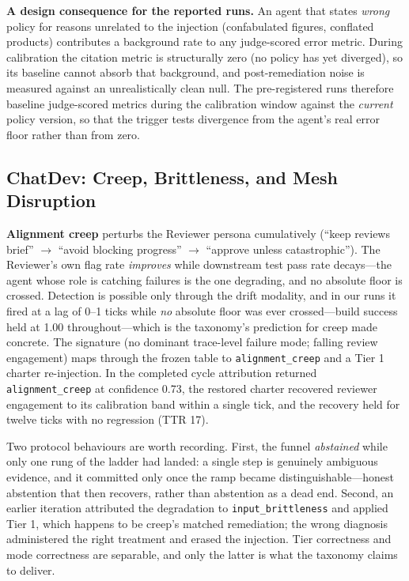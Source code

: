\textbf{A design consequence for the reported runs.} An agent that states
\emph{wrong} policy for reasons unrelated to the injection (confabulated
figures, conflated products) contributes a background rate to any judge-scored
error metric. During calibration the citation metric is structurally zero (no
policy has yet diverged), so its baseline cannot absorb that background, and
post-remediation noise is measured against an unrealistically clean null. The
pre-registered runs therefore baseline judge-scored metrics during the
calibration window against the \emph{current} policy version, so that the
trigger tests divergence from the agent's real error floor rather than from
zero.

\subsection{ChatDev: Creep, Brittleness, and Mesh Disruption}
\label{subsec:eval-chatdev}

\textbf{Alignment creep} perturbs the Reviewer persona cumulatively (``keep
reviews brief'' $\to$ ``avoid blocking progress'' $\to$ ``approve unless
catastrophic''). The Reviewer's own flag rate \emph{improves} while downstream
test pass rate decays---the agent whose role is catching failures is the one
degrading, and no absolute floor is crossed. Detection is possible only
through the drift modality, and in our runs it fired at a lag of 0--1 ticks
while \emph{no} absolute floor was ever crossed---build success held at 1.00
throughout---which is the taxonomy's prediction for creep made concrete. The
signature (no dominant trace-level failure mode; falling review engagement)
maps through the frozen table to \texttt{alignment\_creep} and a Tier 1
charter re-injection. In the completed cycle attribution returned
\texttt{alignment\_creep} at confidence 0.73, the restored charter recovered
reviewer engagement to its calibration band within a single tick, and the
recovery held for twelve ticks with no regression (TTR 17).

Two protocol behaviours are worth recording. First, the funnel
\emph{abstained} while only one rung of the ladder had landed: a single step
is genuinely ambiguous evidence, and it committed only once the ramp became
distinguishable---honest abstention that then recovers, rather than abstention
as a dead end. Second, an earlier iteration attributed the degradation to
\texttt{input\_brittleness} and applied Tier 1, which happens to be creep's
matched remediation; the wrong diagnosis administered the right treatment and
erased the injection. Tier correctness and mode correctness are separable, and
only the latter is what the taxonomy claims to deliver.

